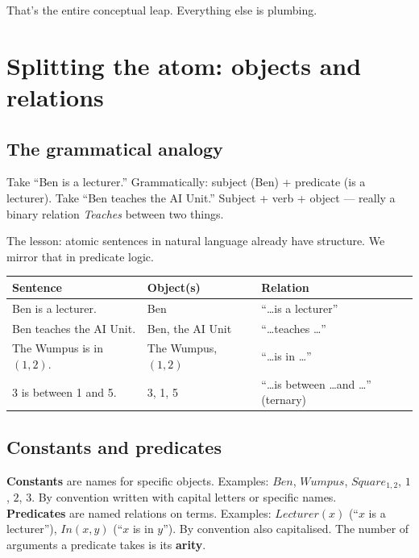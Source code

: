\documentclass[11pt, a4paper]{article}
\newcommand{\thead}[1]{\textbf{#1}}
\begin{document}
That's the entire conceptual leap. Everything else is plumbing.

\section{Splitting the atom: objects and relations}

\subsection{The grammatical analogy}

Take ``Ben is a lecturer.'' Grammatically: subject (Ben) + predicate (is a lecturer). Take ``Ben teaches the AI Unit.'' Subject + verb + object — really a binary relation \emph{Teaches} between two things.

The lesson: atomic sentences in natural language already have structure. We mirror that in predicate logic.

\begin{center}
\begin{tabular}{@{}p{4.5cm}p{4cm}p{5.5cm}@{}}
\toprule
\thead{Sentence} & \thead{Object(s)} & \thead{Relation} \\
\midrule
Ben is a lecturer.       & Ben                  & ``\dots is a lecturer'' \\
Ben teaches the AI Unit. & Ben, the AI Unit     & ``\dots teaches \dots'' \\
The Wumpus is in $(1,2)$. & The Wumpus, $(1,2)$ & ``\dots is in \dots'' \\
3 is between 1 and 5.    & 3, 1, 5              & ``\dots is between \dots and \dots'' (ternary) \\
\bottomrule
\end{tabular}
\end{center}

\subsection{Constants and predicates}

\begin{defbox}
\textbf{Constants} are names for specific objects. Examples: $Ben$, $Wumpus$, $Square_{1,2}$, $1$, $2$, $3$. By convention written with capital letters or specific names.\\[0.3em]
\textbf{Predicates} are named relations on terms. Examples: $Lecturer(x)$ (``$x$ is a lecturer''), $In(x, y)$ (``$x$ is in $y$''). By convention also capitalised. The number of arguments a predicate takes is its \textbf{arity}.
\end{defbox}
\end{document}
